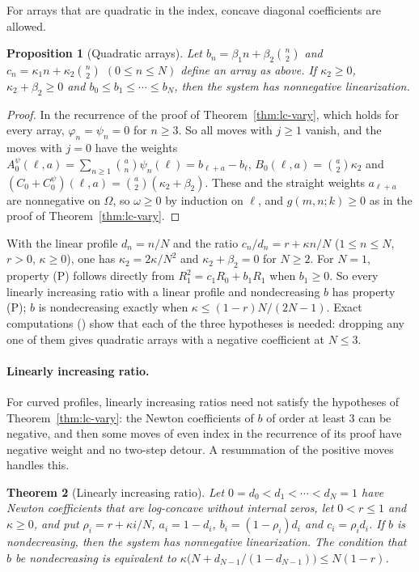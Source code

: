 \documentclass[twoside,10pt]{article}
\numberwithin{equation}{section}
\theoremstyle{slbody}
\newtheorem{theorem}{Theorem}[section]
\newtheorem{proposition}[theorem]{Proposition}
\theoremstyle{definition}
\theoremstyle{remark}
\begin{document}
For arrays that are quadratic in the index, concave diagonal coefficients are allowed.

\begin{proposition}[Quadratic arrays]\label{prop:lc-quad}
Let $b_n=\beta_1n+\beta_2\binom n2$ and $c_n=\kappa_1n+\kappa_2\binom n2$ $(0\leq n\leq N)$ define an array as above. If $\kappa_2\geq0$, $\kappa_2+\beta_2\geq0$ and $b_0\leq b_1\leq\cdots\leq b_N$, then the system has nonnegative linearization.
\end{proposition}

\begin{proof}
In the recurrence of the proof of Theorem~\ref{thm:lc-vary}, which holds for every array, $\varphi_n=\psi_n=0$ for $n\geq3$. So all moves with $j\geq1$ vanish, and the moves with $j=0$ have the weights $A^\psi_0(\ell,a)=\sum_{n\geq1}\binom an\psi_n(\ell)=b_{\ell+a}-b_\ell$, $B_0(\ell,a)=\binom a2\kappa_2$ and $(C_0+C^\psi_0)(\ell,a)=\binom a2(\kappa_2+\beta_2)$. These and the straight weights $a_{\ell+a}$ are nonnegative on $\Omega$, so $\omega\geq0$ by induction on $\ell$, and $g(m,n;k)\geq0$ as in the proof of Theorem~\ref{thm:lc-vary}.
\end{proof}

With the linear profile $d_n=n/N$ and the ratio $c_n/d_n=r+\kappa n/N$ ($1\leq n\leq N$, $r>0$, $\kappa\geq0$), one has $\kappa_2=2\kappa/N^2$ and $\kappa_2+\beta_2=0$ for $N\geq2$. For $N=1$, property (P) follows directly from $R_1^2=c_1R_0+b_1R_1$ when $b_1\geq0$. So every linearly increasing ratio with a linear profile and nondecreasing $b$ has property (P); $b$ is nondecreasing exactly when $\kappa\leq(1-r)N/(2N-1)$. Exact computations () show that each of the three hypotheses is needed: dropping any one of them gives quadratic arrays with a negative coefficient at $N\leq3$.

\paragraph{Linearly increasing ratio.}
For curved profiles, linearly increasing ratios need not satisfy the hypotheses of Theorem~\ref{thm:lc-vary}: the Newton coefficients of $b$ of order at least $3$ can be negative, and then some moves of even index in the recurrence of its proof have negative weight and no two-step detour. A resummation of the positive moves handles this.

\begin{theorem}[Linearly increasing ratio]\label{thm:lc-affine}
Let $0=d_0<d_1<\cdots<d_N=1$ have Newton coefficients that are log-concave without internal zeros, let $0<r\leq1$ and $\kappa\geq0$, and put $\rho_i=r+\kappa i/N$, $a_i=1-d_i$, $b_i=(1-\rho_i)d_i$ and $c_i=\rho_id_i$. If $b$ is nondecreasing, then the system has nonnegative linearization. The condition that $b$ be nondecreasing is equivalent to $\kappa\bigl(N+d_{N-1}/(1-d_{N-1})\bigr)\leq N(1-r)$.
\end{theorem}
\end{document}
